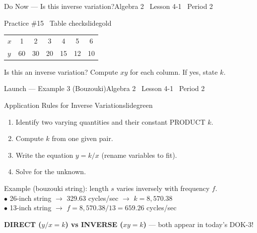 \documentclass[aspectratio=169, 11pt]{beamer}
\begin{document}

\begin{frame}{Do Now --- Is this inverse variation?}{Algebra 2 \textperiodcentered\ Lesson 4-1 \textperiodcentered\ Period 2}
\vspace{0.2cm}
\begin{projcard}{Practice \#15 \textperiodcentered\ Table check}{slidegold}
\begin{tabular}{l|cccccc}
\(x\) & 1 & 2 & 3 & 4 & 5 & 6 \\
\(y\) & 60 & 30 & 20 & 15 & 12 & 10 \\
\end{tabular}

\vspace{0.25cm}
Is this an inverse variation? Compute \(xy\) for each column.
If yes, state \(k\).
\end{projcard}
\end{frame}

\begin{frame}{Launch --- Example 3 (Bouzouki)}{Algebra 2 \textperiodcentered\ Lesson 4-1 \textperiodcentered\ Period 2}
\vspace{0.2cm}
\begin{projcard}{Application Rules for Inverse Variation}{slidegreen}
\begin{enumerate}
  \setlength{\itemsep}{0pt}
  \item Identify two varying quantities and their constant PRODUCT \(k\).
  \item Compute \(k\) from one given pair.
  \item Write the equation \(y = k/x\) (rename variables to fit).
  \item Solve for the unknown.
\end{enumerate}

\vspace{0.1cm}
\small
Example (bouzouki string): length \(s\) varies inversely with frequency \(f\).\\
\hspace*{1em}\(\bullet\) 26-inch string \(\rightarrow\) 329.63 cycles/sec \(\rightarrow\) \(k = 8{,}570.38\)\\
\hspace*{1em}\(\bullet\) 13-inch string \(\rightarrow\) \(f = 8{,}570.38 / 13 = 659.26\) cycles/sec

\vspace{0.1cm}
\textcolor{slideaccent}{\textbf{DIRECT (\(y/x = k\)) vs INVERSE (\(xy = k\))} --- both appear in today's DOK-3!}
\end{projcard}
\end{frame}
\end{document}
